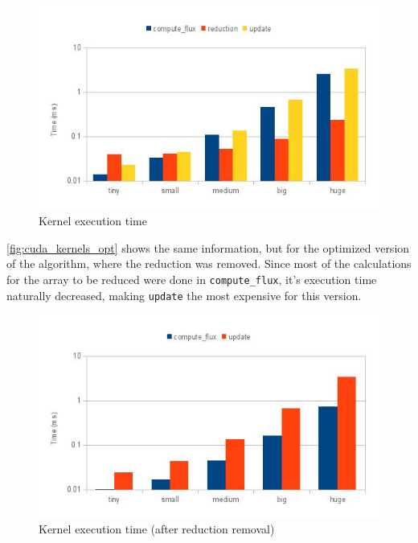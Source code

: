 \documentclass[9pt,twocolumn]{scrartcl}
\begin{document}
\begin{figure}[!htp]
	\begin{center}
		\includegraphics[width=\columnwidth]{images/report/cuda_1_kernels}
	\end{center}
	\caption{Kernel execution time \label{fig:cuda_kernels}}
\end{figure}

\autoref{fig:cuda_kernels_opt} shows the same information, but for the optimized version of the algorithm, where the reduction was removed. Since most of the calculations for the array to be reduced were done in \texttt{compute\_flux}, it's execution time naturally decreased, making \texttt{update} the most expensive for this version.

\begin{figure}[!hpt]
	\begin{center}
		\includegraphics[width=\columnwidth]{images/report/cuda_3_kernels_opt}
	\end{center}
	\caption{Kernel execution time (after reduction removal) \label{fig:cuda_kernels_opt}}
\end{figure}
\end{document}
